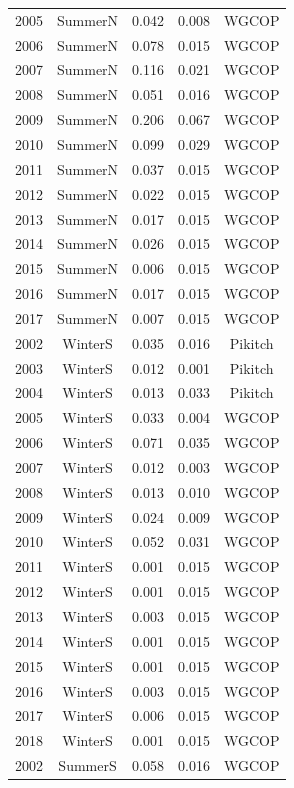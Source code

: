 \documentclass[12pt,]{article}
\begin{document}
\begin{longtable}{ccccc}
  2005 & SummerN & 0.042 & 0.008 & WGCOP \\ 
  2006 & SummerN & 0.078 & 0.015 & WGCOP \\ 
  2007 & SummerN & 0.116 & 0.021 & WGCOP \\ 
  2008 & SummerN & 0.051 & 0.016 & WGCOP \\ 
  2009 & SummerN & 0.206 & 0.067 & WGCOP \\ 
  2010 & SummerN & 0.099 & 0.029 & WGCOP \\ 
  2011 & SummerN & 0.037 & 0.015 & WGCOP \\ 
  2012 & SummerN & 0.022 & 0.015 & WGCOP \\ 
  2013 & SummerN & 0.017 & 0.015 & WGCOP \\ 
  2014 & SummerN & 0.026 & 0.015 & WGCOP \\ 
  2015 & SummerN & 0.006 & 0.015 & WGCOP \\ 
  2016 & SummerN & 0.017 & 0.015 & WGCOP \\ 
  2017 & SummerN & 0.007 & 0.015 & WGCOP \\ 
  2002 & WinterS & 0.035 & 0.016 & Pikitch \\ 
  2003 & WinterS & 0.012 & 0.001 & Pikitch \\ 
  2004 & WinterS & 0.013 & 0.033 & Pikitch \\ 
  2005 & WinterS & 0.033 & 0.004 & WGCOP \\ 
  2006 & WinterS & 0.071 & 0.035 & WGCOP \\ 
  2007 & WinterS & 0.012 & 0.003 & WGCOP \\ 
  2008 & WinterS & 0.013 & 0.010 & WGCOP \\ 
  2009 & WinterS & 0.024 & 0.009 & WGCOP \\ 
  2010 & WinterS & 0.052 & 0.031 & WGCOP \\ 
  2011 & WinterS & 0.001 & 0.015 & WGCOP \\ 
  2012 & WinterS & 0.001 & 0.015 & WGCOP \\ 
  2013 & WinterS & 0.003 & 0.015 & WGCOP \\ 
  2014 & WinterS & 0.001 & 0.015 & WGCOP \\ 
  2015 & WinterS & 0.001 & 0.015 & WGCOP \\ 
  2016 & WinterS & 0.003 & 0.015 & WGCOP \\ 
  2017 & WinterS & 0.006 & 0.015 & WGCOP \\ 
  2018 & WinterS & 0.001 & 0.015 & WGCOP \\ 
  2002 & SummerS & 0.058 & 0.016 & WGCOP \\ 

\end{longtable}
\end{document}
